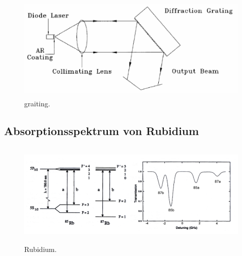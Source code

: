 \begin{figure}[H]
    \centering
    \includegraphics[height=5cm]{content/pics/graiting.png}
    \caption{graiting. \cite{V60}}
    \label{fig:graiting}
\end{figure}

\subsection{Absorptionsspektrum von Rubidium}

\begin{figure}[H]
    \centering
    \includegraphics[height=5cm]{content/pics/Rubidium.png}
    \caption{Rubidium. \cite{V60}}
    \label{fig:rubidium}
\end{figure}

